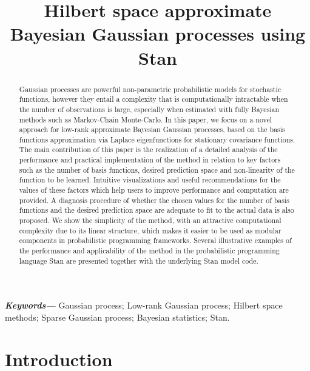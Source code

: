 \documentclass[onecolumn,a4paper,11pt]{article}
\title{Hilbert space approximate Bayesian Gaussian processes using Stan}
\providecommand{\keywords}[1]
{
  \small	
  \textbf{\textit{Keywords---}} #1
}
\begin{document}
\maketitle

\begin{abstract}
Gaussian processes are powerful non-parametric probabilistic models for stochastic functions, however they entail a complexity that is computationally intractable when the number of observations is large, especially when estimated with fully Bayesian methods such as Markov-Chain Monte-Carlo. In this paper, we focus on a novel approach for low-rank approximate Bayesian Gaussian processes, based on the basis functions approximation via Laplace eigenfunctions for stationary covariance functions. The main contribution of this paper is the realization of a detailed analysis of the performance and practical implementation of the method in relation to key factors such as the number of basis functions, desired prediction space and non-linearity of the function to be learned. Intuitive visualizations and useful recommendations for the values of these factors which help users to improve performance and computation are provided. A diagnosis procedure of whether the chosen values for the number of basis functions and the desired prediction space are adequate to fit to the actual data is also proposed. We show the simplicity of the method, with an attractive computational complexity due to its linear structure, which makes it easier to be used as modular components in probabilistic programming frameworks. Several illustrative examples of the performance and applicability of the method in the probabilistic programming language Stan are presented together with the underlying Stan model code.
\end{abstract}

\keywords{Gaussian process; Low-rank Gaussian process; Hilbert space methods; Sparse Gaussian process; Bayesian statistics; Stan.}

\tableofcontents

\section{Introduction}\label{sec_bf_intro}
\end{document}
